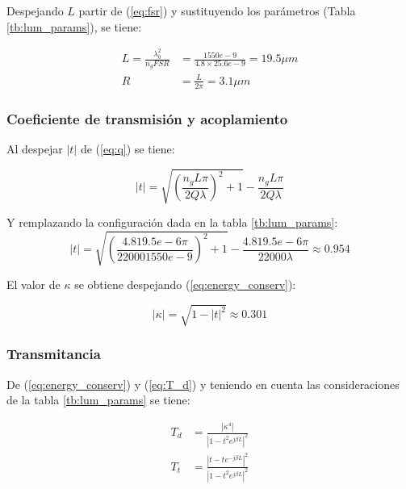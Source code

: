 Despejando $L$ partir de (\ref{eq:fsr}) y sustituyendo los parámetros 
(Tabla \ref{tb:lum_params}), se tiene:

\begin{align*}
L=\frac{\lambda_0^2}{n_g FSR} 
&=\frac{1550e-9}{4.8 \times 25.6e-9}
 =19.5 \mu m  \\ %
R &= \frac{L}{2 \pi} = 3.1 \mu m  %
\end{align*}

\subsubsection{Coeficiente de transmisión y acoplamiento} 

Al despejar $|t|$ de (\ref{eq:q}) se tiene:

\begin{equation}
|t|=\sqrt{ \left( \frac{n_g L \pi}{2 Q \lambda} \right) ^2 + 1} - 
    \frac{n_g L \pi}{2 Q \lambda}
\label{eq:t}
\end{equation} 

Y remplazando la configuración dada en la tabla \ref{tb:lum_params}:
\begin{equation*}
|t|=\sqrt{ \left( \frac{4.8 19.5e-6 \pi}{2 2000 1550e-9} \right) ^2 + 1} - 
    \frac{4.8 19.5e-6 \pi}{2 2000 \lambda}
   \approx 0.954
\label{eq:lum_t}
\end{equation*}

El valor de $\kappa$ se obtiene despejando (\ref{eq:energy_conserv}):

\begin{equation}
|\kappa|=\sqrt{1 - |t|^2} \approx 0.301
\label{eq:lum_k}
\end{equation} 

\subsubsection{Transmitancia}

De (\ref{eq:energy_conserv}) y (\ref{eq:T_d}) y teniendo en cuenta 
las consideraciones de la tabla \ref{tb:lum_params} se tiene:

\begin{align}
T_d&=\frac{|\kappa^4|}{|1 - t^2 e^{j \beta L}|^2} \label{eq:lum_Td} \\
T_t&=\frac{|t -t e^{-j \beta L}|^2}{|1 - t^2 e^{j \beta L}|^2} \label{eq:lum_Tt} 
\end{align} 

